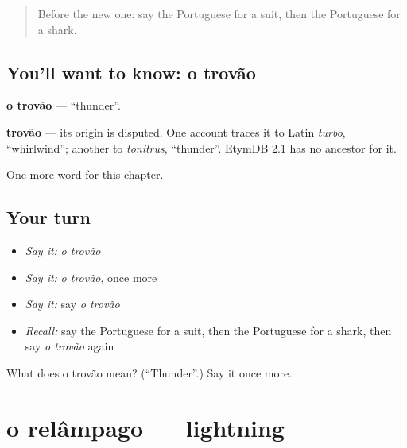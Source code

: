 \label{lesson:PT-C104-trovao}



\begin{quote}
Before the new one: say the Portuguese for a suit, then the Portuguese for a shark.
\end{quote}

\subsection*{You'll want to know: o trovão}
\textbf{o trovão} — \textquotedblleft{}thunder\textquotedblright{}.

\begin{cousinweb}
\textbf{trovão} — its origin is disputed. One account traces it to Latin \emph{turbo}, \textquotedblleft{}whirlwind\textquotedblright{}; another to \emph{tonitrus}, \textquotedblleft{}thunder\textquotedblright{}. EtymDB 2.1 has no ancestor for it.
\end{cousinweb}

\begin{grammarlens}[title={What you've built}]
One more word for this chapter.
\end{grammarlens}

\subsection*{Your turn}
\begin{itemize}
\raggedright
  \item \emph{Say it:} \emph{o trovão}
  \item \emph{Say it:} \emph{o trovão}, once more
  \item \emph{Say it:} say \emph{o trovão}
  \item \emph{Recall:} say the Portuguese for a suit, then the Portuguese for a shark, then say \emph{o trovão} again
\end{itemize}

\begin{tcolorbox}[breakable,colback=teal!4,colframe=teal!35!black,title={Before you move on}]
What does o trovão mean? (\textquotedblleft{}Thunder\textquotedblright{}.) Say it once more.
\end{tcolorbox}
\section[o relâmpago]{o relâmpago — lightning}

\label{lesson:PT-C104-relampago}



